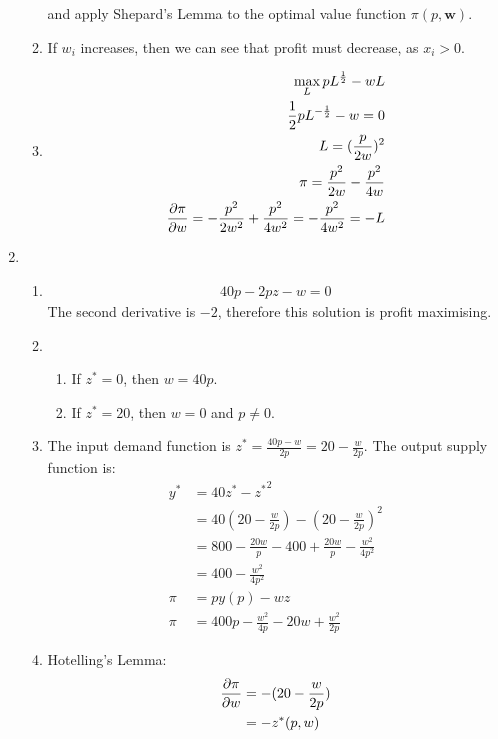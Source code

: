 \documentclass{article}
\begin{document}
\begin{enumerate}
\begin{enumerate}
            and apply Shepard's Lemma to the optimal value function $\pi(p, \textbf{w})$.

            \item If $w_i$ increases, then we can see that profit must decrease, as $x_i > 0$.
            \item \begin{align*}
                \max_{L} pL^\frac{1}{2} - wL \\
                \frac{1}{2}pL^{-\frac{1}{2}} - w = 0 \\
                L = (\frac{p}{2w})^2 \\
                \pi = \frac{p^2}{2w} - \frac{p^2}{4w} \\
                \pdv{\pi}{w} = -\frac{p^2}{2w^2} + \frac{p^2}{4w^2} = -\frac{p^2}{4w^2} = -L
            \end{align*}
        \end{enumerate}

        \item \begin{enumerate}
            \item \begin{align*}
                40p - 2pz - w = 0
            \end{align*}
            The second derivative is $-2$, therefore this solution is profit maximising. 
            \item 
            \begin{enumerate}
                \item If $z^* = 0$, then $w = 40p$.
                \item If $z^* = 20$, then $w = 0$ and $p \neq 0$.  
            \end{enumerate}
            \item The input demand function is $z^* = \frac{40p - w}{2p} = 20 - \frac{w}{2p}$. The output supply function is:
            \begin{align*}
                y^* &= 40z^* - {z^*}^2 \\
                &= 40(20 - \frac{w}{2p}) - (20 - \frac{w}{2p})^2 \\
                &= 800 - \frac{20w}{p} - 400 + \frac{20w}{p} - \frac{w^2}{4p^2}\\
                &= 400 - \frac{w^2}{4p^2}\\
                \pi &= py(p) - wz \\
                \pi &= 400p - \frac{w^2}{4p} - 20w + \frac{w^2}{2p} 
            \end{align*}
            \item Hotelling's Lemma:
            \begin{align*}
                \pdv{\pi}{w} &= -(20 - \frac{w}{2p})\\
                &=-z^*(p,w)
            \end{align*} 
        \end{enumerate}
    \end{enumerate}
\end{document}
